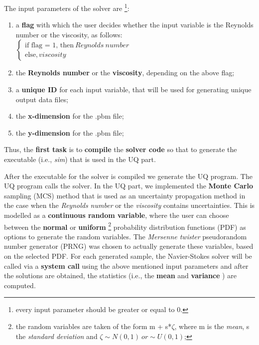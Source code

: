 \documentclass[12pt,a4paper]{article}
\begin{document}
The input parameters of the solver are \footnote{every input parameter should be greater or equal to 0.}:
\begin{enumerate}
\item {a \textbf{flag} with which the user decides whether the input variable is the Reynolds number or the viscosity, as follows}: \\
$\left\{
  \begin{array}{ccl}
    \text{if flag = 1, then} \ Reynolds \ number \\
    \text{else}, viscosity 
  \end{array}
\right.$
\item {the \textbf{Reynolds number} or the \textbf{viscosity}, depending on the above flag};
\item {a \textbf{unique ID} for each input variable, that will be used for generating unique output data files};
\item {the \textbf{x-dimension} for the .pbm file};
\item {the \textbf{y-dimension} for the .pbm file};
\end{enumerate}
%
Thus, the \textbf{first task} is to \textbf{compile} the \textbf{solver code} so that to generate the executable (i.e., \emph{sim}) that is used in the UQ part.
\newline

After the executable for the solver is compiled we generate the UQ program. The UQ program calls the solver. In the UQ part, we implemented the \textbf{Monte Carlo} sampling (MCS) method that is used as an uncertainty propagation method in the case when the \emph{Reynolds number} or the \emph{viscosity} contains uncertainties. This is modelled as a \textbf{continuous random variable}, where the user can choose between the \textbf{normal} or \textbf{uniform} 
\footnote{the random variables are taken of the form m + s*$\zeta$, where m is the \textit{mean}, s the \textit{standard deviation} and $\zeta \sim N(0,1) \ or \sim U(0,1)$;} 
probability distribution functions (PDF) as options to generate the random variables. The \emph{Mersenne twister} pseudorandom number generator (PRNG) was chosen to actually generate these variables, based on the selected PDF. For each generated sample, the Navier-Stokes solver will be called via a \textbf{system call} using the above mentioned input parameters and after the solutions are obtained, the statistics (i.e., the \textbf{mean} and \textbf{variance} ) are computed.
\end{document}
